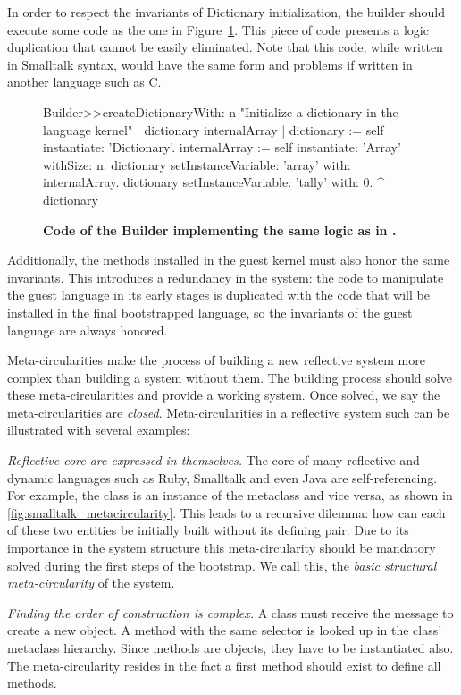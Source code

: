 In order to respect the invariants of Dictionary initialization, the builder should execute some code as the one in Figure~\ref{code:logic_dup2}. This piece of code presents a logic duplication that cannot be easily eliminated. Note that this code, while written in Smalltalk syntax, would have the same form and problems if written in another language such as C.

\begin{figure}[ht]
\begin{code}
Builder>>createDictionaryWith: n
    "Initialize a dictionary in the language kernel"
    | dictionary internalArray |
    dictionary := self instantiate: 'Dictionary'.
    internalArray := self instantiate: 'Array' withSize: n.
    dictionary setInstanceVariable: 'array' with: internalArray.
    dictionary setInstanceVariable: 'tally' with: 0.
    ^ dictionary
\end{code}
\caption{\textbf{Code of the Builder implementing the same logic as in .}\label{code:logic_dup2}}
\end{figure}

Additionally, the methods installed in the guest kernel must also honor the same invariants. This introduces a redundancy in the system: the code to manipulate the guest language in its early stages is duplicated with the code that will be installed in the final bootstrapped language, so the invariants of the guest language are always honored.


Meta-circularities make the process of building a new reflective system more complex than building a system without them. 
The building process should solve these meta-circularities and provide a working system.
Once solved, we say the meta-circularities are \emph{closed}.
Meta-circularities in a reflective system such can be illustrated with several examples:

\begin{description}
\item \emph{Reflective core are expressed in themselves.} The core of many reflective and dynamic languages such as 
Ruby, Smalltalk and even Java are self-referencing. For example, the  class is an instance of the  metaclass and vice versa, as shown in \autoref{fig:smalltalk_metacircularity}.
This leads to a recursive dilemma: how can each of these two entities be initially built without its defining pair.
Due to its importance in the system structure this meta-circularity should be mandatory solved during the first steps of the bootstrap. We call this, the \emph{basic structural meta-circularity} of the system.

\item \emph{Finding the order of construction is complex.} A class must receive the  message to create a new object.
A method with the same selector is looked up in the class' metaclass hierarchy.
Since methods are objects, they have to be instantiated also.
The meta-circularity resides in the fact a first  method should exist to define all methods.
\end{description}

